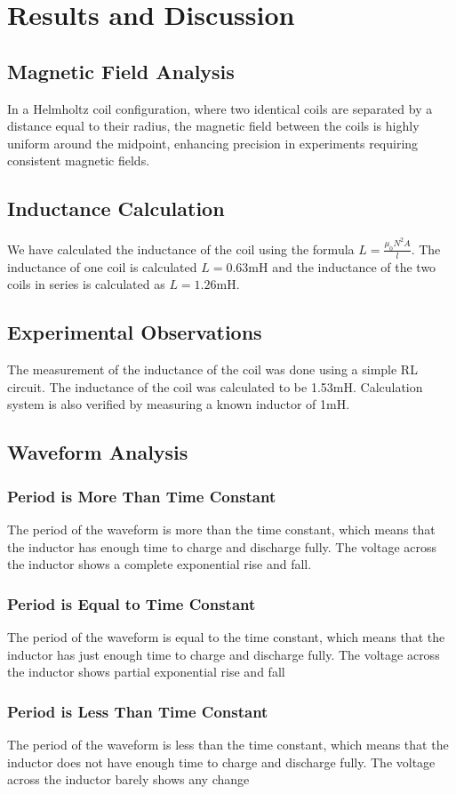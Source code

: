 \chapter{Results and Discussion}

\section{Magnetic Field Analysis}
In a Helmholtz coil configuration, where two identical coils are separated by a distance equal to their radius, the magnetic field between the coils is highly uniform around the midpoint, enhancing precision in experiments requiring consistent magnetic fields.

\section{Inductance Calculation}
We have calculated the inductance of the coil using the formula \( L = \frac{\mu_0 N^2 A}{l} \). The inductance of one coil is calculated \( L = 0.63 \)mH and the inductance of the two coils in series is calculated as \( L = 1.26 \)mH.

\section{Experimental Observations}

The measurement of the inductance of the coil was done using a simple RL circuit. The inductance of the coil was calculated to be 1.53mH. Calculation system is also verified by measuring a known inductor of 1mH.

\section{Waveform Analysis}

\subsection{Period is More Than Time Constant}
The period of the waveform is more than the time constant, which means that the inductor has enough time to charge and discharge fully. The voltage across the inductor shows a complete exponential rise and fall.

\subsection{Period is Equal to Time Constant}
The period of the waveform is equal to the time constant, which means that the inductor has just enough time to charge and discharge fully. The voltage across the inductor shows partial exponential rise and fall

\newpage
\thispagestyle{plain}

\subsection{Period is Less Than Time Constant}
The period of the waveform is less than the time constant, which means that the inductor does not have enough time to charge and discharge fully. The voltage across the inductor barely shows any change
